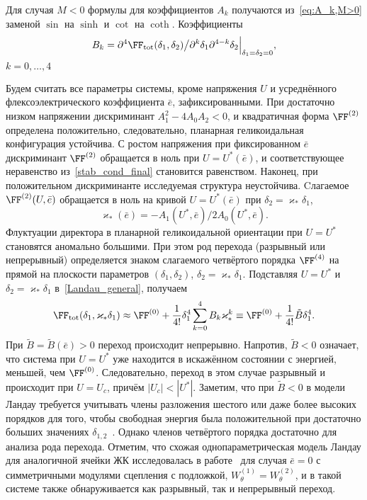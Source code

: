 Для случая $M < 0$ формулы для коэффициентов $A_k$ получаются из~\eqref{eq:A_k,M>0} заменой $\sin$ на $\sinh$ и $\cot$ на $\coth$.
Коэффициенты
\begin{equation}
B_k=\partial^4 \FF_\mathrm{tot}(\delta_1,\delta_2)\big/{\partial^k\delta_1 \partial^{4-k}\delta_2}\Big|_{\delta_1=\delta_2=0},
\label{eq:Bk}
\end{equation}
$k=0,\dots ,4$ 

Будем считать все параметры системы, кроме напряжения $U$ и усреднённого флексоэлектрического коэффициента $\bar{e}$, зафиксированными.
При достаточно низком напряжении дискриминант $A_1^2-4A_0A_2<0$, и квадратичная форма $\FF^{(2)}$ определена положительно, следовательно, планарная геликоидальная конфигурация устойчива.
С ростом напряжения при фиксированном $\bar{e}$ дискриминант $\FF^{(2)}$ обращается в ноль при $U=U^*(\bar{e})$, и соответствующее неравенство из~\eqref{stab_cond_final} становится равенством.
Наконец, при положительном дискриминанте исследуемая структура неустойчива.
Cлагаемое $\FF^{(2)}(U, \bar{e})$ обращается в ноль на кривой $U = U^*(\bar{e})$ при $\delta_2=\varkappa_* \delta_1$,
\begin{equation}
\varkappa_*(\bar{e}) = -{A_1(U^*, \bar{e} )}\big/{2A_0(U^*, \bar{e})}.
\end{equation}
Флуктуации директора в планарной геликоидальной ориентации при $U=U^*$ становятся аномально большими.
При этом род перехода (разрывный или непрерывный) определяется знаком слагаемого четвёртого порядка $\FF^{(4)}$ на прямой на плоскости параметров $(\delta_1, \delta_2)$, $\delta_2 = \varkappa_*\delta_1$.
Подставляя $U = U^*$ и $\delta_2 = \varkappa_* \delta_1$ в~\eqref{Landau_general}, получаем
\begin{equation}\label{F_4_sign}
\FF_\mathrm{tot}(\delta_1,\varkappa_*\delta_1) \approx \FF^{(0)} +\frac{1}{4!}\delta_1^4\sum\limits_{k=0}^4 B_k\varkappa_*^k\equiv\FF^{(0)} +\frac{1}{4!}\tilde{B}\delta_1^4.
\end{equation}
При $\tilde{B}=\tilde{B}(\bar{e})> 0$ переход происходит непрерывно.
Напротив, $\tilde{B} < 0$ означает, что система при $U = U^*$ уже находится в искажённом состоянии с энергией, меньшей, чем $\FF^{(0)}$. Следовательно, переход в этом случае разрывный и происходит при $U = U_c$, причём $|U_c| < |U^*|$.
Заметим, что при $\tilde{B}<0$ в модели Ландау требуется учитывать члены разложения шестого или даже более высоких порядков для того, чтобы свободная энергия была положительной при достаточно больших значениях $\delta_{1,2}$~\cite{LLStat1}.
Однако членов четвёртого порядка достаточно для анализа рода перехода.
Отметим, что схожая однопараметрическая модель Ландау для аналогичной ячейки ЖК исследовалась в работе~\cite{VAR2013} для случая $\bar{e} = 0$ с симметричными модулями сцепления с подложкой, $W_\theta^{(1)}=W_\theta^{(2)}$, и в такой системе также обнаруживается как разрывный, так и непрерывный переход.

